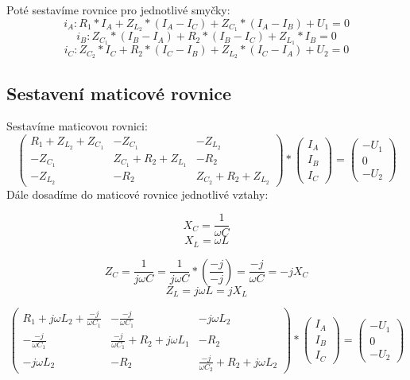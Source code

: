 \documentclass[a4paper]{article}
\begin{document}
\noindent
Poté sestavíme rovnice pro jednotlivé smyčky:
\[i_A: R_1 * I_A + Z_{L_2} * (I_A - I_C) + Z_{C_1} * (I_A - I_B) + U_1 = 0\]
\[i_B: Z_{C_1} * (I_B - I_A) + R_2 * (I_B - I_C) + Z_{L_1} * I_B = 0\]
\[i_C: Z_{C_2} * I_C + R_2 * (I_C - I_B) + Z_{L_2} * (I_C - I_A) + U_2 = 0\]

\subsection{Sestavení maticové rovnice}
Sestavíme maticovou rovnici:
\begin{equation*}
\begin{pmatrix}
R_1 + Z_{L_2} + Z_{C_1} & -Z_{C_1} & -Z_{L_2} \\
-Z_{C_1} & Z_{C_1} + R_2 + Z_{L_1} & -R_2 \\
-Z_{L_2} & -R_2 & Z_{C_2} + R_2 + Z_{L_2}
\end{pmatrix}
*
\begin{pmatrix}
I_A \\
I_B \\
I_C
\end{pmatrix}
=
\begin{pmatrix}
-U_1 \\
0 \\
-U_2
\end{pmatrix}
\end{equation*}
Dále dosadíme do maticové rovnice jednotlivé vztahy:

\[X_C = \frac{1}{\omega C}\]
\[X_L = \omega L\]

\[Z_C = \frac{1}{j\omega C} = \frac{1}{j\omega C} * \left(\frac{-j}{-j}\right) = \frac{-j}{\omega C} = -jX_C\]
\[Z_L = j\omega L = jX_L\]

\begin{equation*}
\begin{pmatrix}
R_1 + j\omega L_2 + \frac{-j}{\omega C_1} & -\frac{-j}{\omega C_1} & -j\omega L_2 \\
-\frac{-j}{\omega C_1} & \frac{-j}{\omega C_1} + R_2 + j\omega L_1 & -R_2 \\
-j\omega L_2 & -R_2 & \frac{-j}{\omega C_2} + R_2 + j\omega L_2
\end{pmatrix}
*
\begin{pmatrix}
I_A \\
I_B \\
I_C
\end{pmatrix}
=
\begin{pmatrix}
-U_1 \\
0 \\
-U_2
\end{pmatrix}
\end{equation*}
\end{document}

